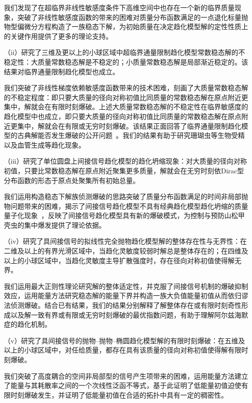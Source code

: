 \documentclass[12pt]{article}
\begin{document}
我们发现了在超临界非线性敏感度条件下高维空间中也存在一个新的临界质量现象，突破了非线性敏感度函数的带来的困难对质量分布函数满足的一点退化标量抛物型偏微分方程构造了一族稳态下解，为初始质量在决定趋化模型解的定性性质上的关键作用提供了更多的理论支持。

（ii）研究了三维及更以上的小球区域中超临界通量限制趋化模型常数稳态解的不稳定性：大质量常数稳态解是不稳定的；小质量常数稳态解是局部渐近稳定的。该结果对临界通量限制趋化模型也成立。

我们突破了非线性梯度依赖敏感度函数带来的技术困难，刻画了大质量常数稳态解的不稳定程度：即只要大质量的径向对称初值比同质量的常数稳态解在原点附近更集中，解就会在有限时刻爆破。上述大质量常数稳态解的不稳定性在临界敏感度的趋化模型中也成立，即只要大质量的径向对称初值比同质量的常数稳态解在原点附近更集中，解就会在有限或无穷时刻爆破。该结果正面回答了临界通量限制趋化模型的古典解能否发生爆破的公开问题~\cite{Marras2023}。我们的结果有助于研究珊瑚虫等生物受精以及血管生成等趋化现象。

（iii）研究了单位圆盘上间接信号趋化模型的趋化坍缩现象：对大质量的径向对称初值，只要比常数稳态解在原点附近聚集更多质量，解就会在无穷时刻依Dirac型分布函数的形态于原点处聚集所有初始总量。

我们运用构造稳态下解族侦测爆破的思路突破了质量分布函数满足的时间非局部抛物问题带来的困难，揭示了间接信号趋化模型不具有经典趋化模型趋化坍缩的质量量子化现象~\cite{Nagai2000,Suzuki2013}，反映了间接信号趋化模型具有新的爆破模式，为控制与预防山松甲壳虫的集中爆发提供了理论依据。

（iv）研究了具间接信号的拟线性完全抛物趋化模型解的整体存在性与无界性：在二维及以上的有界光滑区域中，当趋化灵敏度较弱时解总是整体存在的；在四维及以上的小球区域中，当趋化灵敏度主导扩散强度时，存在径向对称初值使得解无界。

我们运用最大正则性理论研究解的整体适定性，并克服了间接信号机制的爆破抑制效应，运用能量方法研究稳态解的能量下界并构造一族大负值能量初值从而依归谬法侦测爆破。结合已有结果，我们的结果分别解释了解整体存在或有限时刻奇性形成以及解一致有界或有限或无穷时刻爆破的最优指数问题，有助于理解阿尔兹海默症的趋化机制。

（v）研究了具间接信号的抛物--抛物--椭圆趋化模型解的有限时刻爆破：在五维及以上的小球区域中，对任给质量，都存在具有该质量的径向对称初值使得解有限时刻爆破。

我们突破了高度耦合的空间非局部型的信号产生项带来的困难，运用能量方法建立了能量与其耗散率之间的一个次线性泛函不等式，基于此证明了低能量初值迫使有限时刻爆破发生，并证明了低能量初值在合适的拓扑中具有一定的稠密性。
\end{document}
